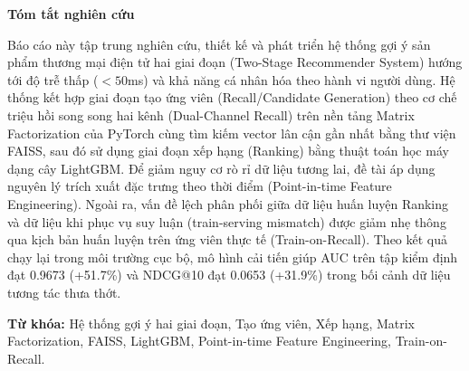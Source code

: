 
\begin{center}
    \Large{\textbf{Tóm tắt nghiên cứu}}
\end{center}
\vspace{1cm}

Báo cáo này tập trung nghiên cứu, thiết kế và phát triển hệ thống gợi ý sản phẩm thương mại điện tử hai giai đoạn (Two-Stage Recommender System) hướng tới độ trễ thấp ($<50$ms) và khả năng cá nhân hóa theo hành vi người dùng. Hệ thống kết hợp giai đoạn tạo ứng viên (Recall/Candidate Generation) theo cơ chế triệu hồi song song hai kênh (Dual-Channel Recall) trên nền tảng Matrix Factorization của PyTorch cùng tìm kiếm vector lân cận gần nhất bằng thư viện FAISS, sau đó sử dụng giai đoạn xếp hạng (Ranking) bằng thuật toán học máy dạng cây LightGBM. Để giảm nguy cơ rò rỉ dữ liệu tương lai, đề tài áp dụng nguyên lý trích xuất đặc trưng theo thời điểm (Point-in-time Feature Engineering). Ngoài ra, vấn đề lệch phân phối giữa dữ liệu huấn luyện Ranking và dữ liệu khi phục vụ suy luận (train-serving mismatch) được giảm nhẹ thông qua kịch bản huấn luyện trên ứng viên thực tế (Train-on-Recall). Theo kết quả chạy lại trong môi trường cục bộ, mô hình cải tiến giúp AUC trên tập kiểm định đạt 0.9673 (+51.7\%) và NDCG@10 đạt 0.0653 (+31.9\%) trong bối cảnh dữ liệu tương tác thưa thớt.

\vspace{1cm}
\noindent \textbf{Từ khóa:} Hệ thống gợi ý hai giai đoạn, Tạo ứng viên, Xếp hạng, Matrix Factorization, FAISS, LightGBM, Point-in-time Feature Engineering, Train-on-Recall.

\pagebreak 
